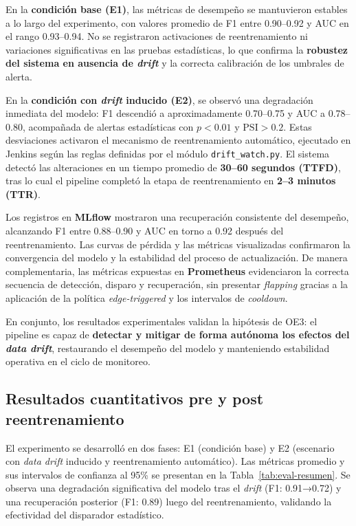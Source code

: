 En la \textbf{condición base (E1)}, las métricas de desempeño se mantuvieron estables a lo largo del experimento, con valores promedio de F1 entre 0.90–0.92 y AUC en el rango 0.93–0.94.  
No se registraron activaciones de reentrenamiento ni variaciones significativas en las pruebas estadísticas, lo que confirma la \textbf{robustez del sistema en ausencia de \textit{drift}} y la correcta calibración de los umbrales de alerta.

En la \textbf{condición con \textit{drift} inducido (E2)}, se observó una degradación inmediata del modelo: F1 descendió a aproximadamente 0.70–0.75 y AUC a 0.78–0.80, acompañada de alertas estadísticas con \(p<0.01\) y \(\mathrm{PSI}>0.2\).  
Estas desviaciones activaron el mecanismo de reentrenamiento automático, ejecutado en Jenkins según las reglas definidas por el módulo \texttt{drift\_watch.py}.  
El sistema detectó las alteraciones en un tiempo promedio de \textbf{30–60 segundos (TTFD)}, tras lo cual el pipeline completó la etapa de reentrenamiento en \textbf{2–3 minutos (TTR)}.

Los registros en \textbf{MLflow} mostraron una recuperación consistente del desempeño, alcanzando F1 entre 0.88–0.90 y AUC en torno a 0.92 después del reentrenamiento.  
Las curvas de pérdida y las métricas visualizadas confirmaron la convergencia del modelo y la estabilidad del proceso de actualización.  
De manera complementaria, las métricas expuestas en \textbf{Prometheus} evidenciaron la correcta secuencia de detección, disparo y recuperación, sin presentar \textit{flapping} gracias a la aplicación de la política \textit{edge-triggered} y los intervalos de \textit{cooldown}.  

En conjunto, los resultados experimentales validan la hipótesis de OE3: el pipeline es capaz de \textbf{detectar y mitigar de forma autónoma los efectos del \textit{data drift}}, restaurando el desempeño del modelo y manteniendo estabilidad operativa en el ciclo de monitoreo.

\subsection{Resultados cuantitativos pre y post reentrenamiento}
\label{subsec:eval-results}

El experimento se desarrolló en dos fases: E1 (condición base) y E2 (escenario con \textit{data drift} inducido y reentrenamiento automático). 
Las métricas promedio y sus intervalos de confianza al 95\% se presentan en la Tabla~\ref{tab:eval-resumen}. 
Se observa una degradación significativa del modelo tras el \textit{drift} (F1: 0.91→0.72) y una recuperación posterior (F1: 0.89) luego del reentrenamiento, validando la efectividad del disparador estadístico.

